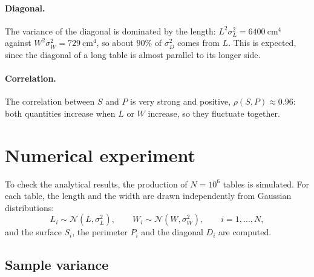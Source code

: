 \documentclass[11pt,a4paper]{article}
\begin{document}
	\paragraph{Diagonal.} The variance of the diagonal is dominated by the length: $L^2\sigma_L^2 = 6400 \ \text{cm}^4$ against $W^2\sigma_W^2 = 729 \ \text{cm}^4$, so about $90\%$ of $\sigma_D^2$ comes from $L$.
	This is expected, since the diagonal of a long table is almost parallel to its longer side.
	
	\paragraph{Correlation.} The correlation between $S$ and $P$ is very strong and positive, $\rho(S, P) \approx 0.96$: both quantities increase when $L$ or $W$ increase, so they fluctuate together.
	
	\section*{Numerical experiment}
	
	To check the analytical results, the production of $N = 10^6$ tables is simulated.
	For each table, the length and the width are drawn independently from Gaussian distributions:
	\begin{equation}
		L_i \sim \mathcal{N}(L, \sigma_L^2), \qquad W_i \sim \mathcal{N}(W, \sigma_W^2), \qquad i = 1, \dots, N ,
	\end{equation}
	and the surface $S_i$, the perimeter $P_i$ and the diagonal $D_i$ are computed.
	
	\subsection*{Sample variance}
	
\end{document}
